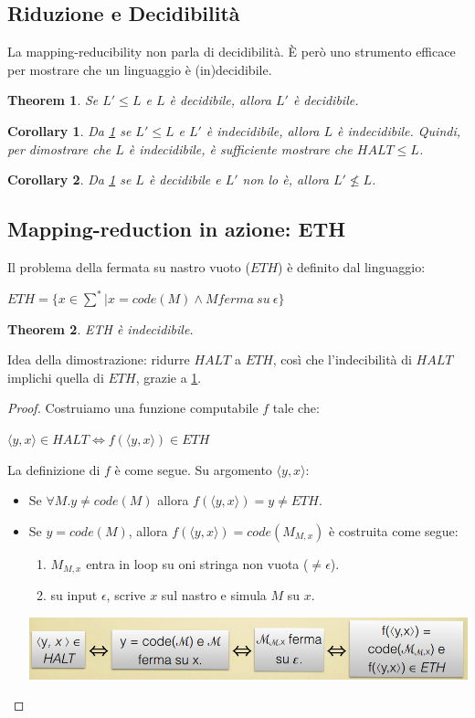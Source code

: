 \documentclass[a4paper, 12pt]{article}
\newtheorem{theorem}{Theorem}[section]
\newtheorem{corollary}{Corollary}[theorem]
\begin{document}
\subsection{Riduzione e Decidibilit\`a}
La mapping-reducibility non parla di decidibilit\`a. \`E per\`o uno strumento efficace per mostrare che un linguaggio \`e (in)decidibile.
\begin{theorem}
\label{th:4}
Se $L' \leq L$ e $L$ \`e decidibile, allora $L'$ \`e decidibile.
\end{theorem}
\begin{corollary}
Da \ref{th:4} se $L' \leq L$ e $L'$ \`e indecidibile, allora $L$ \`e indecidibile. Quindi, per dimostrare che $L$ \`e indecidibile, \`e sufficiente mostrare che $HALT \leq L$.
\end{corollary}
\begin{corollary}
Da \ref{th:4} se $L$ \`e decidibile e $L'$ non lo \`e, allora $L' \nleq L$.
\end{corollary}
\subsection{Mapping-reduction in azione: ETH}
Il problema della fermata su nastro vuoto ($ETH$) \`e definito dal linguaggio:
\begin{center}
$ETH = \{x \in \sum^* | x = code(M) \land M ferma\ su\ \epsilon\}$
\end{center}
\begin{theorem}
\label{th:5}
ETH \`e indecidibile.
\end{theorem}
Idea della dimostrazione: ridurre $HALT$ a $ETH$, cos\`i che l'indecibilit\`a di $HALT$ implichi quella di $ETH$, grazie a \ref{th:4}.
\begin{proof}
Costruiamo una funzione computabile $f$ tale che:
\begin{center}
$\langle y,x \rangle \in HALT \iff f(\langle y,x \rangle) \in ETH$
\end{center}
La definizione di $f$ \`e come segue. Su argomento $\langle y,x \rangle$:
\begin{itemize}
\item Se $\forall M.y \neq code(M)$ allora $f(\langle y,x \rangle) = y \neq ETH$.
\item Se $y=code(M)$, allora $f(\langle y,x \rangle) = code(M_{M,x})$ \`e costruita come segue:
\begin{enumerate}
\item $M_{M,x}$ entra in loop su oni stringa non vuota ($\neq \epsilon$).
\item su input $\epsilon$, scrive $x$ sul nastro e simula $M$ su $x$.\\
\end{enumerate}
\includegraphics[scale=0.4]{ETH1.png}
\end{itemize}
\end{proof}
\end{document}
